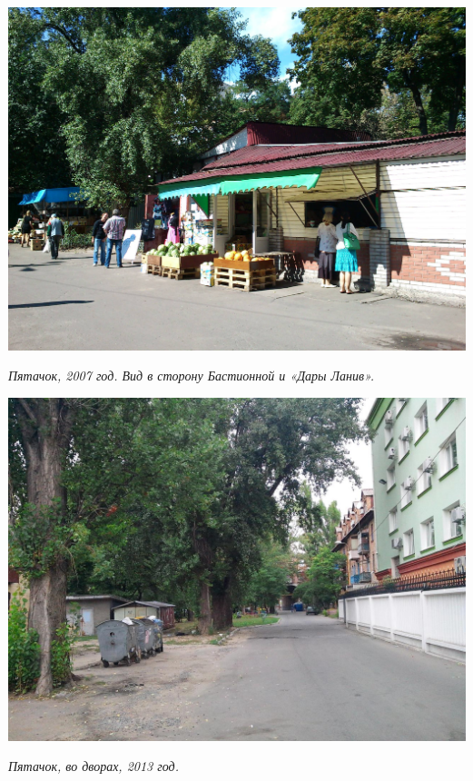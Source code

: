 \begin{center}
\includegraphics[width=0.90\linewidth]{rpix/DSC_0021.JPG}

\textit{Пятачок, 2007 год. Вид в сторону Бастионной и «Дары Ланив».}
\end{center}



\begin{center}
\includegraphics[width=0.95\linewidth]{rpix/IMG_20130826_173616.jpg}

\textit{Пятачок, во дворах, 2013 год.}
\end{center}



